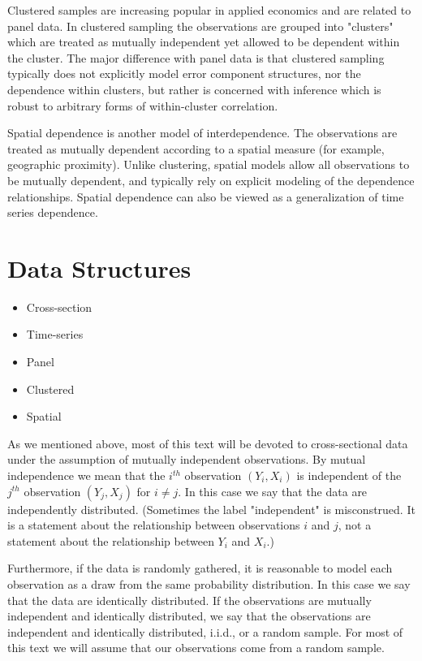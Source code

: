 \documentclass[10pt]{article}
\begin{document}
Clustered samples are increasing popular in applied economics and are related to panel data. In clustered sampling the observations are grouped into "clusters" which are treated as mutually independent yet allowed to be dependent within the cluster. The major difference with panel data is that clustered sampling typically does not explicitly model error component structures, nor the dependence within clusters, but rather is concerned with inference which is robust to arbitrary forms of within-cluster correlation.

Spatial dependence is another model of interdependence. The observations are treated as mutually dependent according to a spatial measure (for example, geographic proximity). Unlike clustering, spatial models allow all observations to be mutually dependent, and typically rely on explicit modeling of the dependence relationships. Spatial dependence can also be viewed as a generalization of time series dependence.

\section{Data Structures}
\begin{itemize}
  \item Cross-section

  \item Time-series

  \item Panel

  \item Clustered

  \item Spatial

\end{itemize}
As we mentioned above, most of this text will be devoted to cross-sectional data under the assumption of mutually independent observations. By mutual independence we mean that the $i^{t h}$ observation $\left(Y_{i}, X_{i}\right)$ is independent of the $j^{t h}$ observation $\left(Y_{j}, X_{j}\right)$ for $i \neq j$. In this case we say that the data are independently distributed. (Sometimes the label "independent" is misconstrued. It is a statement about the relationship between observations $i$ and $j$, not a statement about the relationship between $Y_{i}$ and $X_{i}$.)

Furthermore, if the data is randomly gathered, it is reasonable to model each observation as a draw from the same probability distribution. In this case we say that the data are identically distributed. If the observations are mutually independent and identically distributed, we say that the observations are independent and identically distributed, i.i.d., or a random sample. For most of this text we will assume that our observations come from a random sample.
\end{document}
